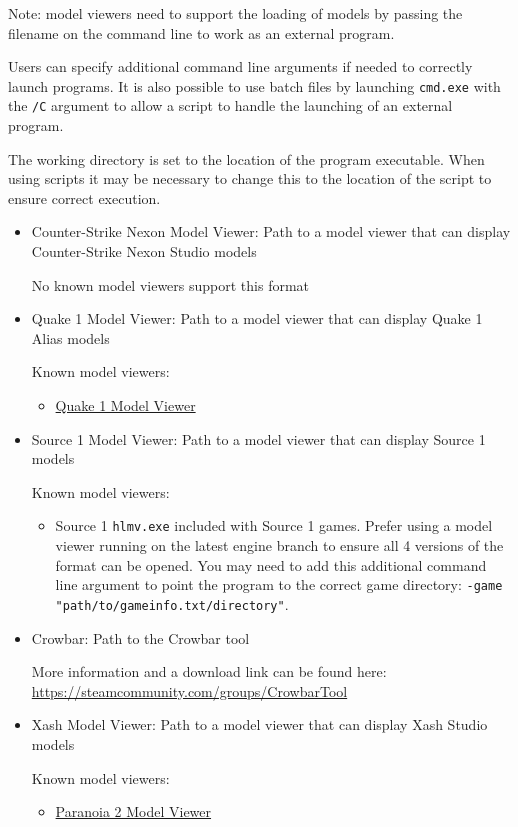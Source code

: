 \documentclass[10pt, a4paper, titlepage, oneside]{article}
\newcommand{\code}[1]{\mbox{\texttt{#1}}}
\begin{document}
Note: model viewers need to support the loading of models by passing the filename on the command line to work as an external program.

Users can specify additional command line arguments if needed to correctly launch programs. It is also possible to use batch files by launching \code{cmd.exe} with the \code{/C} argument to allow a script to handle the launching of an external program.

The working directory is set to the location of the program executable. When using scripts it may be necessary to change this to the location of the script to ensure correct execution.

\begin{itemize}
\item Counter-Strike Nexon Model Viewer: Path to a model viewer that can display Counter-Strike Nexon Studio models

	No known model viewers support this format
\item Quake 1 Model Viewer: Path to a model viewer that can display Quake 1 Alias models

	Known model viewers:
	\begin{itemize}
	\item \href{https://www.moddb.com/games/quake/downloads/quake-1-model-viewer-v050-alpha}{Quake 1 Model Viewer}
	\end{itemize}
\item Source 1 Model Viewer: Path to a model viewer that can display Source 1 models

	Known model viewers:
	\begin{itemize}
	\item Source 1 \code{hlmv.exe} included with Source 1 games. Prefer using a model viewer running on the latest engine branch to ensure all 4 versions of the format can be opened. You may need to add this additional command line argument to point the program to the correct game directory: \code{-game "path/to/gameinfo.txt/directory"}.
	\end{itemize}
\item Crowbar: Path to the Crowbar tool

	More information and a download link can be found here: \url{https://steamcommunity.com/groups/CrowbarTool}
\item Xash Model Viewer: Path to a model viewer that can display Xash Studio models

	Known model viewers:
	\begin{itemize}
	\item \href{https://gamebanana.com/tools/6828}{Paranoia 2 Model Viewer}
	\end{itemize}
\end{itemize}
\end{document}

